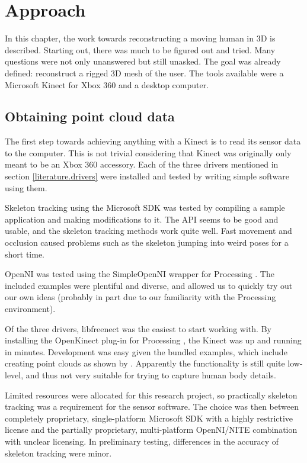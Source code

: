 \chapter{Approach}

In this chapter, the work towards reconstructing a moving human in 3D is described. Starting out, there was much to be figured out and tried. Many questions were not only unanswered but still unasked. The goal was already defined: reconstruct a rigged 3D mesh of the user. The tools available were a Microsoft Kinect for Xbox 360 and a desktop computer.

\section{Obtaining point cloud data}

The first step towards achieving anything with a Kinect is to read its sensor data to the computer. This is not trivial considering that Kinect was originally only meant to be an Xbox 360 accessory. Each of the three drivers mentioned in section \ref{literature.drivers} were installed and tested by writing simple software using them.

Skeleton tracking using the Microsoft SDK was tested by compiling a sample application and making modifications to it. The API seems to be good and usable, and the skeleton tracking methods work quite well. Fast movement and occlusion caused problems such as the skeleton jumping into weird poses for a short time.

OpenNI was tested using the SimpleOpenNI \citep{simpleopenni} wrapper for Processing \citep{processing}. The included examples were plentiful and diverse, and allowed us to quickly try out our own ideas (probably in part due to our familiarity with the Processing environment).

Of the three drivers, libfreenect was the easiest to start working with. By installing the OpenKinect plug-in for Processing \citep{shiffman2010} \citep{processing}, the Kinect was up and running in minutes. Development was easy given the bundled examples, which include creating point clouds as shown by \citet{fisher2010}. Apparently the functionality is still quite low-level, and thus not very suitable for trying to capture human body details.

Limited resources were allocated for this research project, so practically skeleton tracking was a requirement for the sensor software. The choice was then between completely proprietary, single-platform Microsoft SDK with a highly restrictive license and the partially proprietary, multi-platform OpenNI/NITE combination with unclear licensing. In preliminary testing, differences in the accuracy of skeleton tracking were minor.

